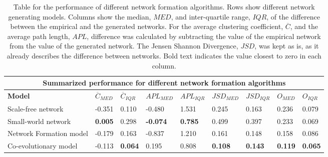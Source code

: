 \documentclass[11pt]{article}
\begin{document}
\begin{table}[H]
\begin{center}
    
\begin{tabular}{ |p{4.2cm}||p{1cm}|p{0.9cm}|p{1.35cm}|p{1.3cm}|p{1.35cm}|p{1.2cm}|p{0.93cm}|p{0.9cm}|}
    \hline
    \multicolumn{9}{|c|}{Summarized performance for different network formation algorithms} \\
    \hline
    \bf{Model} & $\overline{C}_{MED}$ & $\overline{C}_{IQR}$ & $APL_{MED}$ & $APL_{IQR}$ & $JSD_{MED}$ & $JSD_{IQR}$ & $O_{MED}$ & $O_{IQR}$\\
    \hline
    Scale-free network   & -0.351    & 0.110 &   -0.480	 &   1.531 &   0.245 & 0.163 & 0.236 & 0.079\\
    Small-world network &   \bf{0.005}  & 0.298   & \bf{-0.074}	&   \bf{0.785} &   0.499 & 0.397 & 0.233 & 0.069\\
    Network Formation model   &-0.179	 & 0.163	&  -0.837 & 1.210 &   0.161 & 0.148 & 0.158 & 0.086\\
    Co-evolutionary model & -0.113 & \bf{0.064} & 0.195	 & 0.808 & \bf{0.108} & \bf{0.143} & \bf{0.119} & \bf{0.065} \\
    \hline
\end{tabular}
\end{center}
\caption{Table for the performance of different network formation algorithms. Rows show different network generating models. Columns show the median, $MED$, and inter-quartile range, $IQR$, of the difference between the empirical and the generated networks. For the average clustering coefficient, $\overline{C}$, and the average path length, $APL$, difference was calculated by subtracting the value of the empirical network from the value of the generated network. The Jensen Shannon Divergence, $JSD$, was kept as is, as it already describes the difference between networks. Bold text indicates the value closest to zero in each column.}
\label{table:performance}
\end{table}
\end{document}
